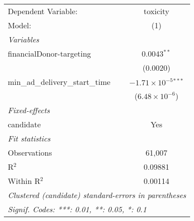 \begingroup
\centering
\begin{tabular}{lc}
   \tabularnewline \midrule \midrule
   Dependent Variable:                & toxicity\\  
   Model:                             & (1)\\  
   \midrule
   \emph{Variables}\\
   financialDonor-targeting           & 0.0043$^{**}$\\   
                                      & (0.0020)\\   
   min\_ad\_delivery\_start\_time     & $-1.71\times 10^{-5}$$^{***}$\\    
                                      & ($6.48\times 10^{-6}$)\\    
   \midrule
   \emph{Fixed-effects}\\
   candidate                          & Yes\\  
   \midrule
   \emph{Fit statistics}\\
   Observations                       & 61,007\\  
   R$^2$                              & 0.09881\\  
   Within R$^2$                       & 0.00114\\  
   \midrule \midrule
   \multicolumn{2}{l}{\emph{Clustered (candidate) standard-errors in parentheses}}\\
   \multicolumn{2}{l}{\emph{Signif. Codes: ***: 0.01, **: 0.05, *: 0.1}}\\
\end{tabular}
\par\endgroup


